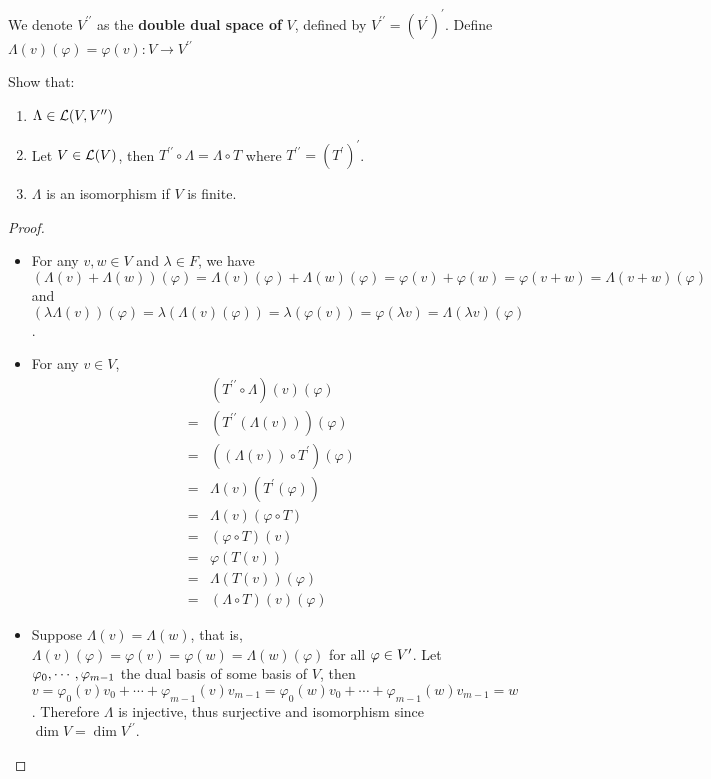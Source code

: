 \documentclass[../main.tex]{subfiles}
\begin{document}
\begin{exercise}
  We denote $V^{\prime\prime}$ as the \textbf{double dual space of} $V$, defined by $V^{\prime\prime} = (V^\prime)^\prime$.
  Define $\Lambda(v)(\varphi) = \varphi(v) : V \rightarrow V^{\prime\prime}$

  Show that:
  \begin{enumerate}
    \item $\Lambda \in \mathcal{L}(V, V^{\prime\prime})$
    \item Let $V \in \mathcal{L}(V)$, then $T^{\prime\prime} \circ \Lambda = \Lambda \circ T$ where $T^{\prime\prime} = (T^\prime)^\prime$.
    \item $\Lambda$ is an isomorphism if $V$ is finite.
  \end{enumerate}
\end{exercise}
\begin{proof}
  ~
  \begin{itemize}
    \item For any $v, w \in V$ and $\lambda \in F$, we have $(\Lambda(v) + \Lambda(w))(\varphi) = \Lambda(v)(\varphi) + \Lambda(w)(\varphi) = \varphi(v) + \varphi(w) = \varphi(v + w) = \Lambda(v + w)(\varphi)$
          and $(\lambda \Lambda(v))(\varphi) = \lambda (\Lambda(v)(\varphi)) = \lambda (\varphi(v)) = \varphi(\lambda v) = \Lambda(\lambda v)(\varphi)$.
    \item For any $v \in V$, 
          \begin{align*}
             & (T^{\prime\prime} \circ \Lambda)(v)(\varphi) \\
            =& (T^{\prime\prime} (\Lambda (v)))(\varphi) \\
            =& ((\Lambda(v)) \circ T^\prime)(\varphi) \\
            =& \Lambda(v)(T^\prime(\varphi)) \\
            =& \Lambda(v)(\varphi \circ T) \\ 
            =& (\varphi \circ T)(v) \\
            =& \varphi (T(v)) \\
            =& \Lambda(T(v))(\varphi) \\
            =& (\Lambda \circ T)(v)(\varphi)
          \end{align*}
    \item Suppose $\Lambda(v) = \Lambda(w)$, that is, $\Lambda(v)(\varphi) = \varphi(v) = \varphi(w) = \Lambda(w)(\varphi)$ for all $\varphi \in \mathnormal{V}^\prime$.
          Let $\varphi_0 , \cdots , \varphi_{m - 1}$ the dual basis of some basis of $V$,
          then $v = \varphi_0(v)v_0 + \cdots + \varphi_{m - 1}(v)v_{m - 1} = \varphi_0(w)v_0 + \cdots + \varphi_{m - 1}(w)v_{m - 1} = w$.
          Therefore $\Lambda$ is injective, thus surjective and isomorphism since $\dim V = \dim V^{\prime\prime}$.
  \end{itemize}
\end{proof}
\end{document}
